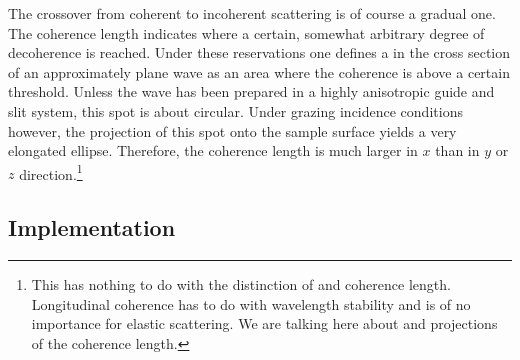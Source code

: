 The crossover from coherent to incoherent scattering is of course
a gradual one.
The coherence length indicates where a certain, somewhat arbitrary degree
of decoherence is reached.
Under these reservations
one defines a 
in the cross section of an approximately plane wave
as an area where the coherence is above a certain threshold.
Unless the wave has been prepared in a highly anisotropic guide and slit system,
this spot is about circular.
Under grazing incidence conditions however,
the projection of this spot onto the sample surface
yields a very elongated ellipse.
Therefore, the coherence length is much larger in $x$ than
in $y$ or $z$ direction.\footnote
{This has nothing to do with the distinction of
   and  coherence length.
  Longitudinal coherence has to do with wavelength stability
  and is of no importance for elastic scattering.
  We are talking here about  and 
  projections of the  coherence length.}

\subsection{Implementation}




%
